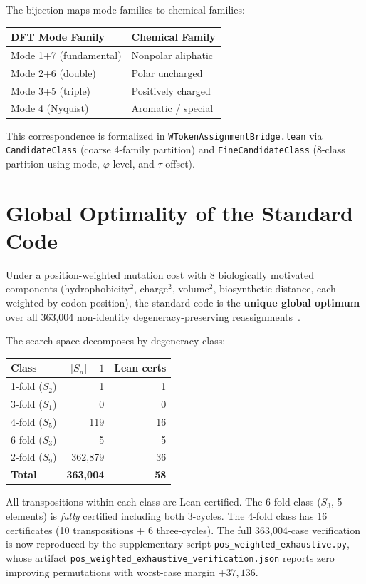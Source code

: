 \documentclass[11pt,twocolumn]{article}
\begin{document}
The bijection maps mode families to chemical families:
\begin{center}
\begin{tabular}{ll}
\toprule
\textbf{DFT Mode Family} & \textbf{Chemical Family} \\
\midrule
Mode 1+7 (fundamental) & Nonpolar aliphatic \\
Mode 2+6 (double) & Polar uncharged \\
Mode 3+5 (triple) & Positively charged \\
Mode 4 (Nyquist) & Aromatic / special \\
\bottomrule
\end{tabular}
\end{center}

This correspondence is formalized in \texttt{WTokenAssignmentBridge.lean}
via \texttt{CandidateClass} (coarse 4-family partition) and
\texttt{FineCandidateClass} (8-class partition using mode, $\varphi$-level,
and $\tau$-offset).

\section{Global Optimality of the Standard Code}

Under a position-weighted mutation cost with 8 biologically motivated
components (hydrophobicity$^2$, charge$^2$, volume$^2$, biosynthetic
distance, each weighted by codon position), the standard code is the
\textbf{unique global optimum} over all 363,004 non-identity
degeneracy-preserving reassignments~\cite{Paper2}.

The search space decomposes by degeneracy class:
\begin{center}
\begin{tabular}{lrr}
\toprule
\textbf{Class} & \textbf{$|S_n|{-}1$} & \textbf{Lean certs} \\
\midrule
1-fold ($S_2$) & 1 & 1 \\
3-fold ($S_1$) & 0 & 0 \\
4-fold ($S_5$) & 119 & 16 \\
6-fold ($S_3$) & 5 & 5 \\
2-fold ($S_9$) & 362,879 & 36 \\
\midrule
\textbf{Total} & \textbf{363,004} & \textbf{58} \\
\bottomrule
\end{tabular}
\end{center}

All transpositions within each class are Lean-certified. The 6-fold class
($S_3$, 5 elements) is \emph{fully} certified including both 3-cycles.
The 4-fold class has 16 certificates (10 transpositions + 6 three-cycles).
The full 363,004-case verification is now reproduced by the supplementary
script \texttt{pos\_weighted\_exhaustive.py}, whose artifact
\texttt{pos\_weighted\_exhaustive\_verification.json} reports
zero improving permutations with worst-case margin $+37{,}136$.
\end{document}
